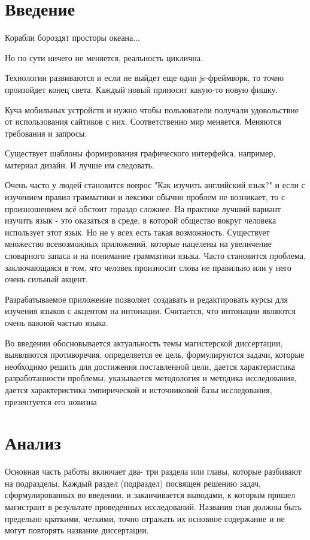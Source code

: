 



%

\section{Введение}
	Корабли бороздят просторы океана...
	
	Но по сути ничего не меняется, реальность циклична.

	Технологии развиваются и если не выйдет еще один js-фреймворк, то
	точно произойдет конец света. Каждый новый приносит какую-то
	новую фишку.

	Куча мобильных устройств и нужно чтобы пользователи получали удовольствие
	от использования сайтиков с них.
	Соответственно мир меняется. Меняются требования и запросы.

	Существует шаблоны формирования графического интерфейса, например, материал дизайн.
	И лучше им следовать.

	Очень часто у людей становится вопрос "Как изучить английский язык?"{} и если
	с изучением правил грамматики и лексики обычно проблем не возникает, то с произношением
	всё обстоит гораздо сложнее.
	На практике лучший вариант изучить язык - это оказаться в среде, в которой общество вокруг человека
	использует этот язык.
	Но не у всех есть такая возможность. Существует множество всевозможных приложений, которые
	нацелены на увеличение словарного запаса и на понимание грамматики языка.
	Часто становится проблема, заключающаяся в том, что человек произносит слова не правильно или
	у него очень сильный акцент. 

	Разрабатываемое приложение позволяет создавать и редактировать курсы для изучения языков с
	акцентом на интонации.
	Считается, что интонации являются очень важной частью языка.






	Во введении обосновывается актуальность темы магистерской диссертации,
	выявляются противоречия, определяется ее цель, формулируются задачи, которые
	необходимо решить для достижения поставленной цели, дается характеристика
	разработанности проблемы, указывается методология и методика исследования, дается
	характеристика эмпирической и источниковой базы исследования, презентуется его
	новизна

\section{Анализ}
	Основная часть работы включает два- три раздела или главы, которые
	разбивают на подразделы. Каждый раздел (подраздел) посвящен решению задач,
	сформулированных во введении, и заканчивается выводами, к которым пришел
	магистрант в результате проведенных исследований. Названия глав должны быть
	предельно краткими, четкими, точно отражать их основное содержание и не могут
	повторять название диссертации.

